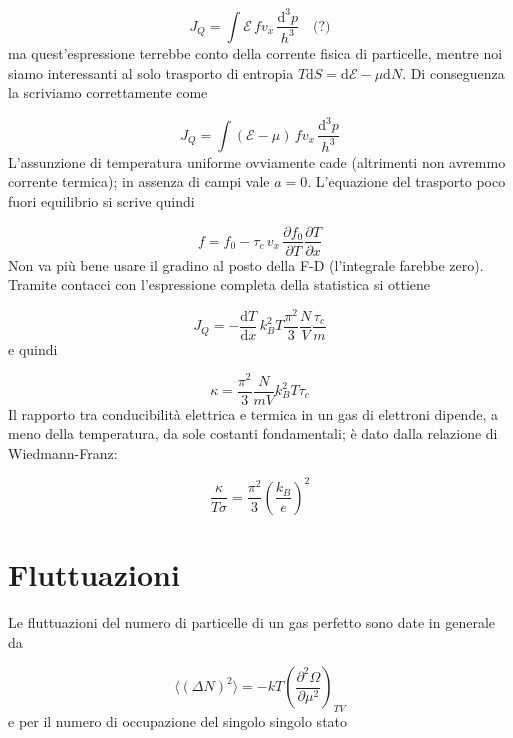 \documentclass[a4paper]{report}
\begin{document}
\begin{equation}
    J_Q = \int \mathcal{E}\,f v_x \,\frac{\mathrm{d}^3 p}{h^3} \quad \text{(?)}
\end{equation}
ma quest'espressione terrebbe conto della corrente fisica di particelle, mentre noi siamo interessanti al solo trasporto di entropia $T\mathrm{d}S = \mathrm{d}\mathcal{E}-\mu \mathrm{d}N$. Di conseguenza la scriviamo correttamente come

\begin{equation}
 J_Q = \int (\mathcal{E}-\mu)\,f v_x \,\frac{\mathrm{d}^3 p}{h^3}
\end{equation}
L'assunzione di temperatura uniforme ovviamente cade (altrimenti non avremmo corrente termica); in assenza di campi vale $a = 0$. L'equazione del trasporto poco fuori equilibrio si scrive quindi

\begin{equation}
    f = f_0 - \tau_c \,v_x \,\frac{\partial f_0}{\partial T}\frac{\partial T}{\partial x}
\end{equation}
Non va più bene usare il gradino al posto della F-D (l'integrale farebbe zero). Tramite contacci con l'espressione completa della statistica si ottiene

\begin{equation}
    J_Q = - \frac{\mathrm{d}T}{\mathrm{d}x}\,k_B^2 T \frac{\pi^2}{3} \frac{N}{V} \frac{\tau_c}{m}
\end{equation}
e quindi

\begin{equation}
    \kappa = \frac{\pi^2}{3} \frac{N}{m V} k_B^2 T \tau_c
\end{equation}
Il rapporto tra conducibilità elettrica e termica in un gas di elettroni dipende, a meno della temperatura, da sole costanti fondamentali; è dato dalla relazione di Wiedmann-Franz:

\begin{equation}
\frac{\kappa}{T\sigma} = \frac{\pi^2}{3} \left(\frac{k_B}{e}\right)^2 
\end{equation}

\section{Fluttuazioni}

Le fluttuazioni del numero di particelle di un gas perfetto sono date in generale da

\begin{equation}
    \langle(\Delta N)^2\rangle = - k T \left(\frac{\partial^2 \Omega}{\partial \mu^2}\right)_{TV}
\end{equation}
e per il numero di occupazione del singolo singolo stato
\end{document}
